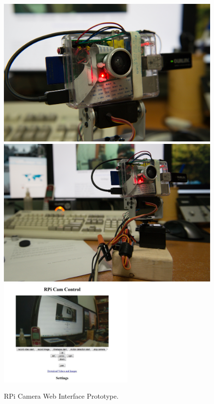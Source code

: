			\begin{figure}[H]
				\centering
				\caption{RPi Camera Web Interface Prototype.}
				\includegraphics[width=.45\textwidth]{gfx/picam.jpg} \includegraphics[width=.45\textwidth]{gfx/picam2.jpg}
				\includegraphics[width=0.6\textwidth]{gfx/picam3.jpg}
				\end{figure}
